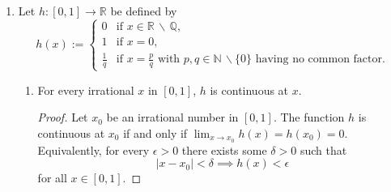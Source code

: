\begin{enumerate}
\begin{enumerate}
\begin{enumerate}
\begin{proof}
                            The proof immediately follows from the intermediate value theorem, which states that there exists $p \in (c, d)$ such that
                            \[
                                f(p) = \frac{\int_a^b f(x) \, g(x) \, dx}{\int_a^b g(x) \, dx},
                            \]
                            or
                            \[
                                f(p) \int_a^b g(x) \, dx = \int_a^b f(x) \, g(x) \, dx.
                            \]

                            Since $(c, d) \subset [a, b]$, it follows that $p \in (a, b)$.
                        \end{proof}

                \end{enumerate}

                \bigskip

            \item Let $h: [0, 1] \to \mathbb{R}$ be defined by
                \[
                    h(x) :=
                    \begin{cases}
                        0 & \text{if $x \in \mathbb{R} \, \backslash \, \mathbb{Q}$}, \\
                        1 & \text{if $x = 0$}, \\
                        \frac{1}{q} & \text{if $x = \frac{p}{q}$ with $p, q \in \mathbb{N} \, \backslash \{0\}$ having no common factor.}
                    \end{cases}
                \]

                \bigskip

                \begin{enumerate}

                    \item
                        \begin{proposition} \label{prop:1di}
                            For every irrational $x$ in $[0, 1]$, $h$ is continuous at $x$.
                        \end{proposition}

                        \begin{proof}
                            Let $x_0$ be an irrational number in $[0, 1]$.
                            The function $h$ is continuous at $x_0$ if and only if $\lim_{x \to x_0} h(x) = h(x_0) = 0$.
                            Equivalently, for every $\epsilon > 0$ there exists some $\delta > 0$ such that
                            \begin{equation} \label{eq:epsilon-delta}
                                |x - x_0| < \delta \implies h(x) < \epsilon
                            \end{equation}
                            for all $x \in [0, 1]$.


\end{proof}
\end{enumerate}
\end{enumerate}
\end{enumerate}
